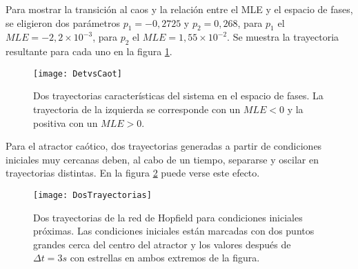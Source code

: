Para mostrar la transición al caos y la relación entre el MLE y el espacio de fases, se eligieron dos parámetros $p_1 = -0,2725$ y $p_2 = 0,268$, para $p_1$ el $MLE = -2,2\times10^{-3}$, para $p_2$ el $MLE = 1,55\times10^{-2}$.
Se muestra la trayectoria resultante para cada uno en la figura \ref{fig:DetvsCaot}.
\begin{figure}
	\centering
	\texttt{[image: DetvsCaot]}\\
	\caption{Dos trayectorias características del sistema en el espacio de fases. La trayectoria de la izquierda se corresponde con un $MLE < 0$ y la positiva con un $MLE > 0$.}
	\label{fig:DetvsCaot}
\end{figure}

Para el atractor caótico, dos trayectorias generadas a partir de condiciones iniciales muy cercanas deben, al cabo de un tiempo, separarse y oscilar en trayectorias distintas.
En la figura \ref{fig:DosTrayectorias} puede verse este efecto.
\begin{figure}
	\centering
	\texttt{[image: DosTrayectorias]}\\
	\caption{Dos trayectorias de la red de Hopfield para condiciones iniciales próximas.
		Las condiciones iniciales están marcadas con dos puntos grandes cerca del centro del atractor y los	valores después de $\Delta t = 3s$ con estrellas en ambos extremos de la figura.}
	\label{fig:DosTrayectorias}
\end{figure}